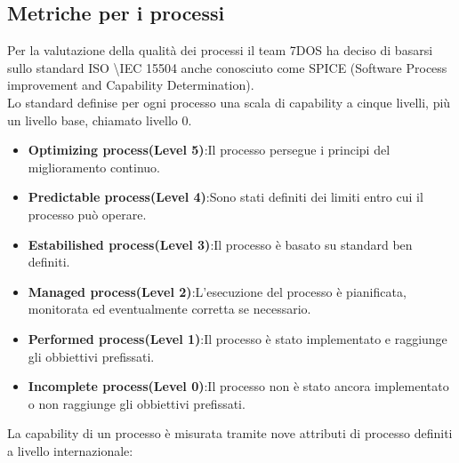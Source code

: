 \subsection{Metriche per i processi}
Per la valutazione della qualità dei processi il team 7DOS ha deciso di basarsi sullo standard ISO \textbackslash IEC 15504 anche conosciuto come SPICE (Software Process improvement and Capability Determination). \\
Lo standard definise per ogni processo una scala di capability a cinque livelli, più un livello base, chiamato livello 0.
\begin{itemize}
	\item{\textbf{Optimizing process(Level 5)}}:Il processo persegue i principi del miglioramento continuo.
	\item{\textbf{Predictable process(Level 4)}}:Sono stati definiti dei limiti entro cui il processo può operare.
	\item{\textbf{Estabilished process(Level 3)}}:Il processo è basato su standard ben definiti.
	\item{\textbf{Managed process(Level 2)}}:L'esecuzione del processo è pianificata, monitorata ed eventualmente corretta se necessario.
	\item{\textbf{Performed process(Level 1)}}:Il processo è stato implementato e raggiunge gli obbiettivi prefissati.
	\item{\textbf{Incomplete process(Level 0)}}:Il processo non è stato ancora implementato o non raggiunge gli obbiettivi prefissati.
\end{itemize}
La capability di un processo è misurata tramite nove attributi di processo definiti a livello internazionale:
